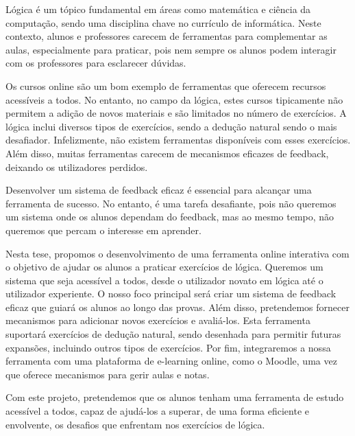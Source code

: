 
%


Lógica é um tópico fundamental em áreas como matemática e ciência da computação, sendo uma disciplina chave no currículo de informática. Neste contexto, alunos e professores carecem de ferramentas para complementar as aulas, especialmente para praticar, pois nem sempre os alunos podem interagir com os professores para esclarecer dúvidas.

Os cursos online são um bom exemplo de ferramentas que oferecem recursos acessíveis a todos. No entanto, no campo da lógica, estes cursos tipicamente não permitem a adição de novos materiais e são limitados no número de exercícios. A lógica inclui diversos tipos de exercícios, sendo a dedução natural sendo o mais desafiador. Infelizmente, não existem ferramentas disponíveis com esses exercícios. Além disso, muitas ferramentas carecem de mecanismos eficazes de feedback, deixando os utilizadores perdidos.

Desenvolver um sistema de feedback eficaz é essencial para alcançar uma ferramenta de sucesso. No entanto, é uma tarefa desafiante, pois não queremos um sistema onde os alunos dependam do feedback, mas ao mesmo tempo, não queremos que percam o interesse em aprender.

Nesta tese, propomos o desenvolvimento de uma ferramenta online interativa com o objetivo de ajudar os alunos a praticar exercícios de lógica. Queremos um sistema que seja acessível a todos, desde o utilizador novato em lógica até o utilizador experiente. O nosso foco principal será criar um sistema de feedback eficaz que guiará os alunos ao longo das provas. Além disso, pretendemos fornecer mecanismos para adicionar novos exercícios e avaliá-los. Esta ferramenta suportará exercícios de dedução natural, sendo desenhada para permitir futuras expansões, incluindo outros tipos de exercícios. Por fim, integraremos a nossa ferramenta com uma plataforma de e-learning online, como o Moodle, uma vez que oferece mecanismos para gerir aulas e notas.

Com este projeto, pretendemos que os alunos tenham uma ferramenta de estudo acessível a todos, capaz de ajudá-los a superar, de uma forma eficiente e envolvente, os desafios que enfrentam nos exercícios de lógica.

